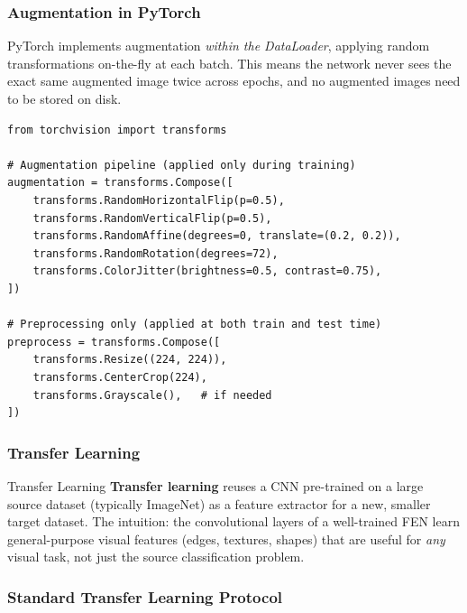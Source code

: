 \documentclass[11pt,a4paper]{article}
\newcommand{\term}[1]{\textcolor{DefGreen}{\textbf{#1}}\index{#1}}
\begin{document}
\subsubsection{Augmentation in PyTorch}

PyTorch implements augmentation \emph{within the DataLoader}, applying random transformations on-the-fly at each batch. This means the network never sees the exact same augmented image twice across epochs, and no augmented images need to be stored on disk.

\begin{lstlisting}[caption={Stacking augmentation transforms in PyTorch}]
from torchvision import transforms

# Augmentation pipeline (applied only during training)
augmentation = transforms.Compose([
    transforms.RandomHorizontalFlip(p=0.5),
    transforms.RandomVerticalFlip(p=0.5),
    transforms.RandomAffine(degrees=0, translate=(0.2, 0.2)),
    transforms.RandomRotation(degrees=72),
    transforms.ColorJitter(brightness=0.5, contrast=0.75),
])

# Preprocessing only (applied at both train and test time)
preprocess = transforms.Compose([
    transforms.Resize((224, 224)),
    transforms.CenterCrop(224),
    transforms.Grayscale(),   # if needed
])
\end{lstlisting}

\subsubsection{Transfer Learning}
\label{sec:transfer_learning}

\begin{defbox}{Transfer Learning}
\term{Transfer learning} reuses a CNN pre-trained on a large source dataset (typically ImageNet) as a feature extractor for a new, smaller target dataset. The intuition: the convolutional layers of a well-trained FEN learn general-purpose visual features (edges, textures, shapes) that are useful for \emph{any} visual task, not just the source classification problem.
\end{defbox}

\subsubsection{Standard Transfer Learning Protocol}
\end{document}
